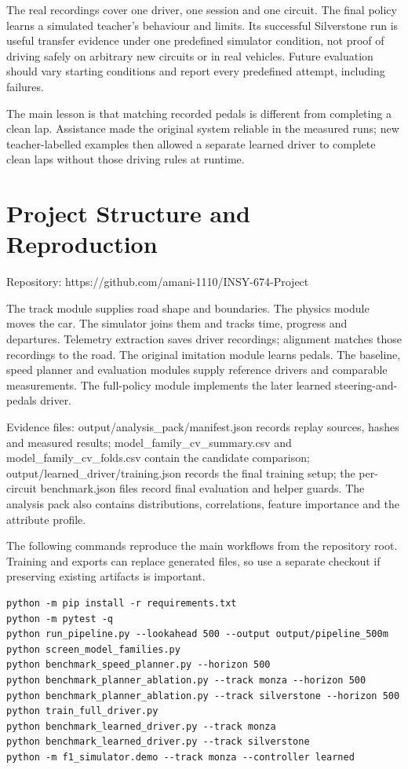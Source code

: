 \documentclass[11pt,a4paper]{article}
\begin{document}
The real recordings cover one driver, one session and one circuit. The final policy learns a simulated teacher's behaviour and limits. Its successful Silverstone run is useful transfer evidence under one predefined simulator condition, not proof of driving safely on arbitrary new circuits or in real vehicles. Future evaluation should vary starting conditions and report every predefined attempt, including failures.

The main lesson is that matching recorded pedals is different from completing a clean lap. Assistance made the original system reliable in the measured runs; new teacher-labelled examples then allowed a separate learned driver to complete clean laps without those driving rules at runtime.
\section{Project Structure and Reproduction}
Repository: https://github.com/amani-1110/INSY-674-Project

The track module supplies road shape and boundaries. The physics module moves the car. The simulator joins them and tracks time, progress and departures. Telemetry extraction saves driver recordings; alignment matches those recordings to the road. The original imitation module learns pedals. The baseline, speed planner and evaluation modules supply reference drivers and comparable measurements. The full-policy module implements the later learned steering-and-pedals driver.

Evidence files: output/analysis\_pack/manifest.json records replay sources, hashes and measured results; model\_family\_cv\_summary.csv and model\_family\_cv\_folds.csv contain the candidate comparison; output/learned\_driver/training.json records the final training setup; the per-circuit benchmark.json files record final evaluation and helper guards. The analysis pack also contains distributions, correlations, feature importance and the attribute profile.

The following commands reproduce the main workflows from the repository root. Training and exports can replace generated files, so use a separate checkout if preserving existing artifacts is important.
\begin{Verbatim}[fontsize=\scriptsize]
python -m pip install -r requirements.txt
python -m pytest -q
python run_pipeline.py --lookahead 500 --output output/pipeline_500m
python screen_model_families.py
python benchmark_speed_planner.py --horizon 500
python benchmark_planner_ablation.py --track monza --horizon 500
python benchmark_planner_ablation.py --track silverstone --horizon 500
python train_full_driver.py
python benchmark_learned_driver.py --track monza
python benchmark_learned_driver.py --track silverstone
python -m f1_simulator.demo --track monza --controller learned
\end{Verbatim}
\end{document}
